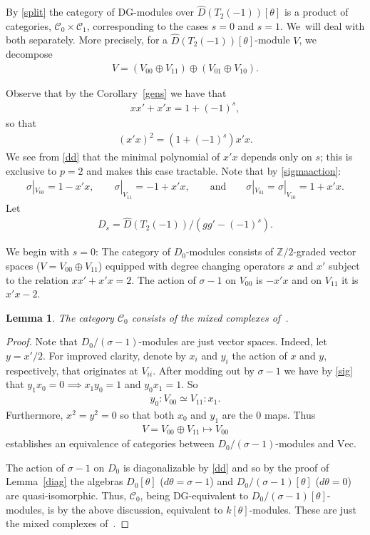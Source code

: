 \documentclass[10pt,a4paper]{amsart}
\numberwithin{equation}{section}
\newtheorem{Lemma}[Theorem]{Lemma}
\newcommand{\Cc}{\mathcal{C}}
\newcommand{\vect}{\text{Vec}}
\begin{document}
By \eqref{split} the category of DG-modules over $\widehat{D}(T_2(-1))[\theta]$ is a product of categories, $\Cc_0\times \Cc_1$, corresponding to the cases $s=0$ and $s=1$. We~will deal with both separately. More precisely, for a $\widehat{D}(T_2(-1))[\theta]$-module $V$, we decompose
\begin{gather}
V=(V_{00}\oplus V_{11})\oplus(V_{01}\oplus V_{10}).
\end{gather}

Observe that by the Corollary~\ref{gens} we have that
\begin{gather}
xx'+x'x=1+(-1)^s,
\end{gather}
so that
\begin{gather}\label{dd}
(x'x)^2=(1+(-1)^s)x'x.
\end{gather}
We see from \eqref{dd} that the minimal polynomial of $x'x$ depends only on $s$; this is exclusive to $p=2$ and makes this case tractable. Note that by \eqref{sigmaaction}:
\begin{gather}\label{sig}
\sigma|_{V_{00}}=1-x'x,\qquad \sigma|_{V_{11}}=-1+x'x,\qquad\text{and}\qquad \sigma|_{V_{01}}=\sigma|_{V_{10}}=1+x'x.
\end{gather} Let
\begin{gather}
D_s=\widehat{D}(T_2(-1))/(gg'-(-1)^s).
\end{gather}

We begin with $s=0$: The category of $D_0$-modules consists of $\mathbb{Z}/2$-graded vector spaces ($V=V_{00}\oplus V_{11}$) equipped with degree changing operators $x$ and $x'$ subject to the relation $xx'+x'x=2$. The action of $\sigma-1$ on $V_{00}$ is $-x'x$ and on $V_{11}$ it is $x'x-2$.

\begin{Lemma}
The category $\Cc_0$ consists of the mixed complexes of~{\rm \cite{kassel}}.
\end{Lemma}

 \begin{proof}
Note that $D_0/(\sigma-1)$-modules are just vector spaces. Indeed, let $y=x'/2$. For improved clarity, denote by $x_i$ and $y_i$ the action of $x$ and $y$, respectively, that originates at $V_{ii}$. After modding out by $\sigma-1$ we have by \eqref{sig} that $y_1x_0=0\implies x_1y_0=1$ and $y_0x_1=1$. So
\begin{gather}
y_0:V_{00}\simeq V_{11}: x_1.
\end{gather}
Furthermore, $x^2=y^2=0$ so that both $x_0$ and $y_1$ are the $0$ maps. Thus
\begin{gather}
V=V_{00}\oplus V_{11}\mapsto V_{00}
\end{gather}
establishes an equivalence of categories between $D_0/(\sigma-1)$-modules and $\vect$.

The action of $\sigma-1$ on $D_0$ is diagonalizable by \eqref{dd} and so by the proof of Lemma~\ref{diag} the algebras $D_0[\theta]$ ($d\theta=\sigma-1$) and $D_0/(\sigma-1)[\theta]$ ($d\theta=0$) are quasi-isomorphic. Thus, $\Cc_0$, being DG-equivalent to $D_0/(\sigma-1)[\theta]$-modules, is by the above discussion, equivalent to $k[\theta]$-modules. These are just the mixed complexes of~\cite{kassel}.
\end{proof}
\end{document}
